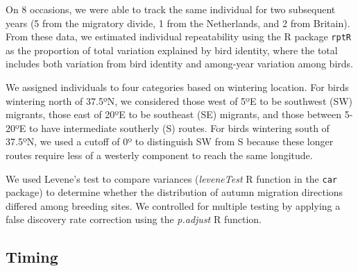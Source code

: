 \documentclass[a4paper, nobind]{templates/ociamthesis}
\begin{document}
On 8 occasions, we were able to track the same individual for two subsequent years (5 from the migratory divide, 1 from the Netherlands, and 2 from Britain). From these data, we estimated individual repeatability using the R package \texttt{rptR} \autocite{stoffelRptRRepeatabilityEstimation2017} as the proportion of total variation explained by bird identity, where the total includes both variation from bird identity and among-year variation among birds.

We assigned individuals to four categories based on wintering location. For birds wintering north of 37.5ºN, we considered those west of 5ºE to be southwest (SW) migrants, those east of 20ºE to be southeast (SE) migrants, and those between 5-20ºE to have intermediate southerly (S) routes. For birds wintering south of 37.5ºN, we used a cutoff of 0º to distinguish SW from S because these longer routes require less of a westerly component to reach the same longitude.

We used Levene's test to compare variances (\emph{leveneTest} R function in the \texttt{car} package) to determine whether the distribution of autumn migration directions differed among breeding sites. We controlled for multiple testing by applying a false discovery rate correction using the \emph{p.adjust} R function.

\hypertarget{timing}{%
\subsection{Timing}\label{timing}}
\end{document}
